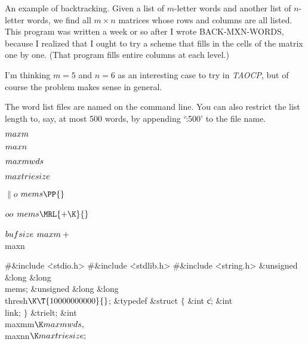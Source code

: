 

An example of backtracking. Given a list of $m$-letter words and
another
list of $n$-letter words, we find all $m\times n$ matrices whose rows and
columns are all listed. This program was written a week or so after I wrote
{\mc BACK-MXN-WORDS}, because I realized that I ought to try a scheme
that fills in the cells of the matrix one by one. (That program
fills entire columns at each level.)

I'm thinking $m=5$ and $n=6$ as an interesting case to try in {\sl TAOCP},
but of course the problem makes sense in general.

The word list files are named on the command line. You can also restrict
the list length to, say, at most 500 words, by appending `\.{:500}' to
the file name.

\Y\B\4\D$\\{maxm}$ \5
\par
\B\4\D$\\{maxn}$ \5
\par
\B\4\D$\\{maxmwds}$ \5
\par
\B\4\D$\\{maxtriesize}$ \5
\par
\B\4\D$\|o$ \5
$\\{mems}\PP{}$\par
\B\4\D$\\{oo}$ \5
$\\{mems}\MRL{+{\K}}{}$\par
\B\4\D$\\{bufsize}$ \5
$\\{maxm}+{}$\\{maxn}\par
\Y\B\8\#\&{include} \.{<stdio.h>}\6
\8\#\&{include} \.{<stdlib.h>}\6
\8\#\&{include} \.{<string.h>}\6
\&{unsigned} \&{long} \&{long} \\{mems};\6
\&{unsigned} \&{long} \&{long} \\{thresh}${}\K\T{10000000000}{}$;\6
\&{typedef} \&{struct} ${}\{{}$\1\6
\&{int} \|c;\6
\&{int} \\{link};\2\6
${}\}{}$ \&{trielt};\6
\&{int} \\{maxmm}${}\K\\{maxmwds},{}$ \\{maxnn}${}\K\\{maxtriesize};{}$\6
